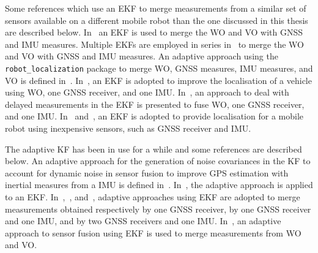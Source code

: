 Some references which use an \gls{EKF} to merge measurements from a similar set of sensors available on a different mobile robot than the one discussed in this thesis are described below.
In~\cite{9024731} an \gls{EKF} is used to merge the \gls{WO} and \gls{VO} with \gls{GNSS} and \gls{IMU} measures.
Multiple \glspl{EKF} are employed in series in~\cite{9075286} to merge the \gls{WO} and \gls{VO} with \gls{GNSS} and \gls{IMU} measures.
An adaptive approach using the \texttt{robot\_localization} package to merge \gls{WO}, \gls{GNSS} measures, \gls{IMU} measures, and \gls{VO} is defined in~\cite{CHEN1298238}.
In~\cite{magnusson_improving_2012}, an \gls{EKF} is adopted to improve the localisation of a vehicle using \gls{WO}, one \gls{GNSS} receiver, and one \gls{IMU}.
In~\cite{8c506f630d4e478dace903637fa0a75b}, an approach to deal with delayed measurements in the \gls{EKF} is presented to fuse \gls{WO}, one \gls{GNSS} receiver, and one \gls{IMU}.
In~\cite{king_low_2008} and~\cite{skog2005low}, an \gls{EKF} is adopted to provide localisation for a mobile robot using inexpensive sensors, such as \gls{GNSS} receiver and \gls{IMU}.

The adaptive \gls{KF} has been in use for a while and some references are described below.
An adaptive approach for the generation of noise covariances in the \gls{KF} to account for dynamic noise in sensor fusion to improve \gls{GPS} estimation with inertial measures from a \gls{IMU} is defined in~\cite{mohamed1999adaptive}.
In~\cite{grandoni_sensor_2001}, the adaptive approach is applied to an \gls{EKF}.
In~\cite{kong_using_2012},~\cite{Werries-2016-5519}, and~\cite{hao_modified_2018}, adaptive approaches using \gls{EKF} are adopted to merge measurements obtained respectively by one \gls{GNSS} receiver, by one \gls{GNSS} receiver and one \gls{IMU}, and by two \gls{GNSS} receivers and one \gls{IMU}.
In~\cite{chenavier_position_1992}, an adaptive approach to sensor fusion using \gls{EKF} is used to merge measurements from \gls{WO} and \gls{VO}.


